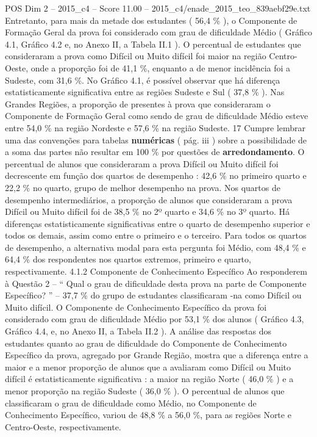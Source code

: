 \begin{textsample}{POS Dim 2 – 2015\_c4 – Score 11.00 – 2015\_c4/enade\_2015\_teo\_839aebf29e.txt}
Entretanto, para mais da metade dos estudantes ( 56,4 \% ), o Componente de Formação Geral da prova foi considerado com grau de dificuldade Médio ( Gráfico 4.1, Gráfico 4.2 e, no Anexo II, a Tabela II.1 ).
O percentual de estudantes que consideraram a prova como Difícil ou Muito difícil foi maior na região Centro-Oeste, onde a proporção foi de 41,1 \%, enquanto a de menor incidência foi a Sudeste, com 31,6 \%.
No Gráfico 4.1, é possível observar que há diferença estatisticamente significativa entre as regiões Sudeste e Sul ( 37,8 \% ).
Nas Grandes Regiões, a proporção de presentes à prova que consideraram o Componente de Formação Geral como sendo de grau de dificuldade Médio esteve entre 54,0 \% na região Nordeste e 57,6 \% na região Sudeste. 17 Cumpre lembrar uma das convenções para tabelas \textbf{numéricas} ( pág. iii ) sobre a possibilidade de a soma das partes não resultar em 100 \% por questões de \textbf{arredondamento}.
O percentual de alunos que consideraram a prova Difícil ou Muito difícil foi decrescente em função dos quartos de desempenho : 42,6 \% no primeiro quarto e 22,2 \% no quarto, grupo de melhor desempenho na prova.
Nos quartos de desempenho intermediários, a proporção de alunos que consideraram a prova Difícil ou Muito difícil foi de 38,5 \% no 2º quarto e 34,6 \% no 3º quarto.
Há diferenças estatisticamente significativas entre o quarto de desempenho superior e todos os demais, assim como entre o primeiro e o terceiro.
Para todos os quartos de desempenho, a alternativa modal para esta pergunta foi Médio, com 48,4 \% e 64,4 \% dos respondentes nos quartos extremos, primeiro e quarto, respectivamente. 4.1.2 Componente de Conhecimento Específico Ao responderem à Questão 2 – “ Qual o grau de dificuldade desta prova na parte de Componente Específico? ” – 37,7 \% do grupo de estudantes classificaram -na como Difícil ou Muito difícil.
O Componente de Conhecimento Específico da prova foi considerado com grau de dificuldade Médio por 53,1 \% dos alunos ( Gráfico 4.3, Gráfico 4.4, e, no Anexo II, a Tabela II.2 ).
A análise das respostas dos estudantes quanto ao grau de dificuldade do Componente de Conhecimento Específico da prova, agregado por Grande Região, mostra que a diferença entre a maior e a menor proporção de alunos que a avaliaram como Difícil ou Muito difícil é estatisticamente significativa : a maior na região Norte ( 46,0 \% ) e a menor proporção na região Sudeste ( 36,0 \% ).
O percentual de alunos que classificaram o grau de dificuldade como Médio, no Componente de Conhecimento Específico, variou de 48,8 \% a 56,0 \%, para as regiões Norte e Centro-Oeste, respectivamente.

\end{textsample}

